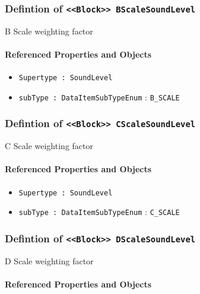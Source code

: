 \subsubsection{Defintion of \texttt{<<Block>> BScaleSoundLevel}}
  \label{type:BScaleSoundLevel}

\FloatBarrier

B Scale weighting factor

\FloatBarrier
\paragraph{Referenced Properties and Objects}

\begin{itemize}
\item \texttt{Supertype : SoundLevel}

\item \texttt{subType : DataItemSubTypeEnum} : \texttt{B_SCALE}

\end{itemize}
\FloatBarrier
\subsubsection{Defintion of \texttt{<<Block>> CScaleSoundLevel}}
  \label{type:CScaleSoundLevel}

\FloatBarrier

C Scale weighting factor

\FloatBarrier
\paragraph{Referenced Properties and Objects}

\begin{itemize}
\item \texttt{Supertype : SoundLevel}

\item \texttt{subType : DataItemSubTypeEnum} : \texttt{C_SCALE}

\end{itemize}
\FloatBarrier
\subsubsection{Defintion of \texttt{<<Block>> DScaleSoundLevel}}
  \label{type:DScaleSoundLevel}

\FloatBarrier

D Scale weighting factor

\FloatBarrier
\paragraph{Referenced Properties and Objects}

